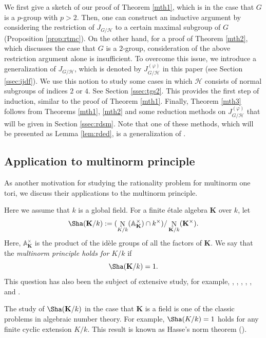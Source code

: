 \documentclass[12pt]{amsart}
\theoremstyle{plain}
\theoremstyle{definition}
\numberwithin{thm}{section}
\numberwithin{equation}{section}
\newcommand{\A}{\mathbb{A}}
\newcommand{\bK}{\mathbf{K}}
\newcommand{\cH}{\mathcal{H}}
\DeclareMathOperator{\N}{N}
\begin{document}
We first give a sketch of our proof of Theorem \ref{mth1}, which is in the case that $G$ is a $p$-group with $p>2$. Then, one can construct an inductive argument by considering the restriction of $J_{G/\cH}$ to a certain maximal subgroup of $G$ (Proposition \ref{prop:rtmc}). On the other hand, for a proof of Theorem \ref{mth2}, which discusses the case that $G$ is a $2$-group, consideration of the above restriction argument alone is insufficient. To overcome this issue, we introduce a generalization of $J_{G/\cH}$, which is denoted by $J_{G/\cH}^{(\varphi)}$ in this paper (see Section \ref{ssec:ijdf}). We use this notion to
study some cases in which $\cH$ consists of normal subgroups of indices $2$ or $4$. See Section \ref{ssec:tgs2}. This provides the first step of induction, similar to the proof of Theorem \ref{mth1}. Finally, Theorem \ref{mth3} follows from Theorems \ref{mth1}, \ref{mth2} and some reduction methods on $J_{G/\cH}^{(\varphi)}$ that will be given in Section \ref{ssec:rdsm}. Note that one of these methods, which will be presented as Lemma \ref{lem:rded}, is a generalization of \cite[Proposition 1.3]{Endo2011}. 

\subsection{Application to multinorm principle}

As another motivation for studying the rationality problem for multinorm one tori, we discuss their applications to the multinorm principle.

Here we assume that $k$ is a global field. For a finite {\'e}tale algebra $\bK$ over $k$, let
\begin{equation*}
    \Sha(\bK/k):=(\N_{K/k}(\A_{\bK}^\times)\cap k^\times)/\N_{\bK/k}(\bK^\times). 
\end{equation*}
Here, $\A_{\bK}^{\times}$ is the product of the id{\`e}le groups of all the factors of $\bK$.
We say that the \emph{multinorm principle holds for $K/k$} if 
\begin{equation*}
    \Sha(\bK/k)=1. 
\end{equation*}
This question has also been the subject of extensive study, for example, \cite{Hurlimann1984}, \cite{Demarche2014}, \cite{BayerFluckiger2019}, \cite{Lee2022}, \cite{Huang2024}, and \cite{Liang2024}. 

The study of $\Sha(\bK/k)$ in the case that $\bK$ is a field is one of the classic problems in algebraic number theory. For example, $\Sha(K/k)=1$ holds for any finite cyclic extension $K/k$. This result is known as Hasse's norm theorem (\cite[Satz, p.~64]{Hasse1931}).
\end{document}
